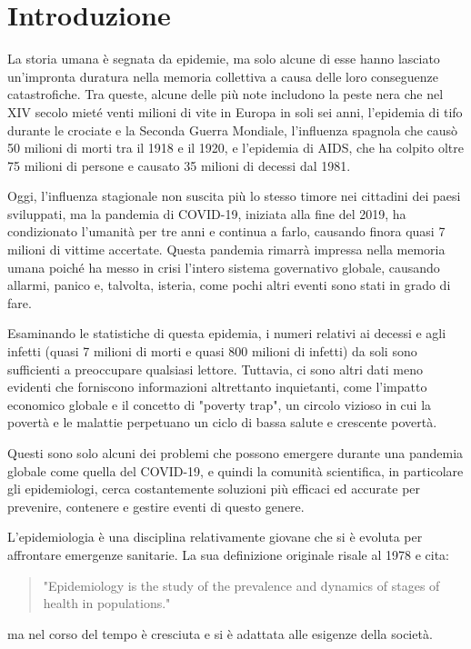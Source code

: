 \section{Introduzione}
La storia umana è segnata da epidemie, ma solo alcune di esse hanno 
lasciato un'impronta duratura nella memoria collettiva a causa delle loro 
conseguenze catastrofiche. Tra queste, alcune delle più note includono la 
peste nera che nel XIV secolo mieté venti milioni di vite in Europa in 
soli sei anni, l'epidemia di tifo durante le crociate e la Seconda 
Guerra Mondiale, l'influenza spagnola che causò 50 milioni di morti tra 
il 1918 e il 1920, e l'epidemia di AIDS, che ha colpito oltre 75 milioni 
di persone e causato 35 milioni di decessi dal 1981.

Oggi, l'influenza stagionale non suscita più lo stesso timore nei 
cittadini dei paesi sviluppati, ma la pandemia di COVID-19, iniziata alla 
fine del 2019, ha condizionato l'umanità per tre anni e continua a farlo, 
causando finora quasi 7 milioni di vittime accertate. Questa pandemia 
rimarrà impressa nella memoria umana poiché ha messo in crisi l'intero 
sistema governativo globale, causando allarmi, panico e, talvolta, 
isteria, come pochi altri eventi sono stati in grado di fare.

Esaminando le statistiche di questa epidemia, i numeri relativi ai decessi 
e agli infetti (quasi 7 milioni di morti e quasi 800 milioni di infetti) 
da soli sono sufficienti a preoccupare qualsiasi lettore. Tuttavia, ci 
sono altri dati meno evidenti che forniscono informazioni altrettanto 
inquietanti, come l'impatto economico globale e il concetto di 
"poverty trap", un circolo vizioso in cui la povertà e le malattie 
perpetuano un ciclo di bassa salute e crescente povertà.

Questi sono solo alcuni dei problemi che possono emergere durante una 
pandemia globale come quella del COVID-19, e quindi la comunità 
scientifica, in particolare gli epidemiologi, cerca costantemente 
soluzioni più efficaci ed accurate per prevenire, contenere e gestire 
eventi di questo genere.

L'epidemiologia è una disciplina relativamente giovane che si è evoluta 
per affrontare emergenze sanitarie. La sua definizione originale risale 
al 1978 \cite{Frerichs1978-cn} e cita: 
\begin{quote}
    	"Epidemiology is the study of the prevalence and dynamics of stages of health in populations."
\end{quote}
ma nel corso del tempo è cresciuta e si è adattata alle esigenze 
della società. 

